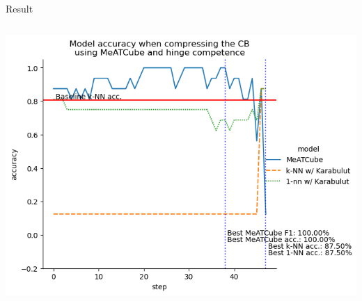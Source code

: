 \documentclass[]{beamer}
\begin{document}
\begin{frame}{Result}
\begin{columns}
\begin{column}{.65\textwidth}
            \includegraphics[width=.8\textwidth]{../results-weight-estim+/figs/hepatitis.png}
        \end{column}
    \end{columns}
\end{frame}
\end{document}
